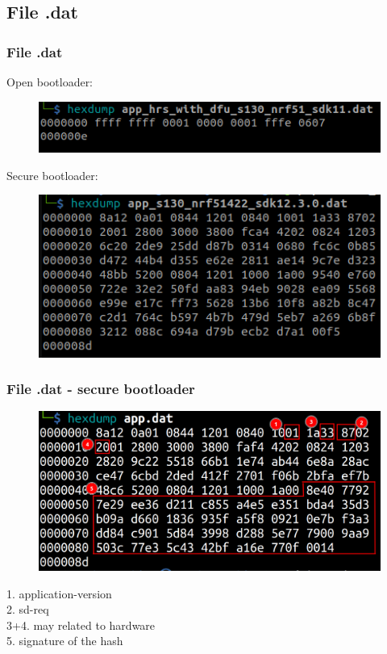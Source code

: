 \documentclass[34pt]{beamer}
\begin{document}
\subsection{File .dat}
\begin{frame}
	\frametitle{File .dat}
	Open bootloader:
\begin{figure}[H]
	\centering
	\includegraphics[width=0.9\linewidth]{../project_Report/images/dat-open}
\end{figure}
Secure bootloader:
\begin{figure}[H]
	\centering
	\includegraphics[width=0.9\linewidth]{../project_Report/images/dat-secure}
\end{figure}

\end{frame}
\begin{frame}
	\frametitle{File .dat - secure bootloader}
	
\begin{figure}[H]
	\centering
	\includegraphics[width=0.7\linewidth]{../project_Report/images/reverse-dat-file-secure}
\end{figure}
\begin{center}
	1. application-version\\
2. sd-req\\
3+4. may related to hardware\\
5. signature of the hash	

\end{center}

\end{frame}
\end{document}
